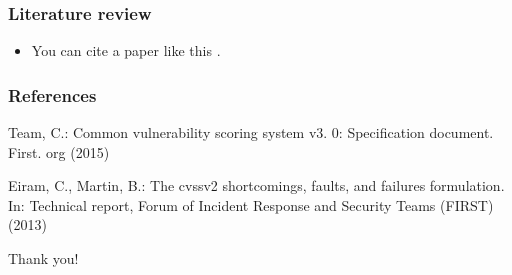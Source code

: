 \documentclass[utf8]{beamer}%
\begin{document}
	\begin{frame}
		\frametitle{Literature review}
		\begin{itemize}
			\item You can cite a paper like this \cite{team2015common,eiram2013cvssv2}.
		\end{itemize}
	\end{frame}
	
	
	\begin{frame}
		\frametitle{References}
		
		\begin{thebibliography}{99} %
			Team, C.: Common vulnerability scoring system v3. 0: Specification document.
			First. org  (2015)
			
			Eiram, C., Martin, B.: The cvssv2 shortcomings, faults, and failures
			formulation. In: Technical report, Forum of Incident Response and Security
			Teams (FIRST) (2013)
			
		\end{thebibliography}
	\end{frame}
	
	
	\begin{frame}
		\Huge{\centerline{Thank you!}}
	\end{frame}
	
\end{document}
